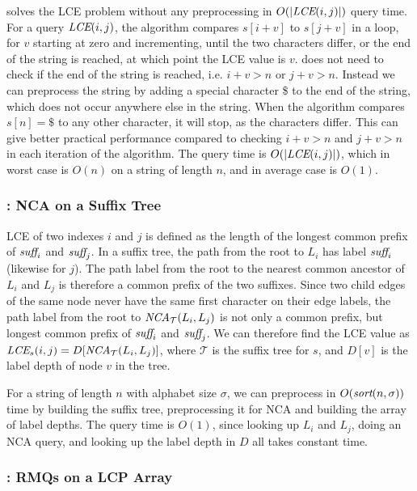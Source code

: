 \documentclass[a4]{article}
\begin{document}
 solves the LCE problem without any preprocessing in $O(|\textit{LCE}(i,j)|)$ query time. For a query $\textit{LCE}(i,j)$, the algorithm compares $s[i+v]$ to $s[j+v]$ in a loop, for $v$ starting at zero and incrementing, until the two characters differ, or the end of the string is reached, at which point the LCE value is $v$.  does not need to check if the end of the string is reached, i.e. $i+v>n$ or $j+v>n$. Instead we can preprocess the string by adding a special character \$ to the end of the string, which does not occur anywhere else in the string. When the algorithm compares $s[n] = \$$ to any other character, it will stop, as the characters differ. This can give better practical performance compared to checking $i+v>n$ and $j+v>n$ in each iteration of the algorithm. The query time is $O(|\textit{LCE}(i,j)|)$, which in worst case is $O(n)$ on a string of length $n$, and in average case is $O(1)$.

\subsubsection{: NCA on a Suffix Tree}

LCE of two indexes $i$ and $j$ is defined as the length of the longest common prefix of $\textit{suff}_i$ and $\textit{suff}_j$. In a suffix tree, the path from the root to $L_i$ has label $\textit{suff}_i$ (likewise for $j$). The path label from the root to the nearest common ancestor of $L_i$ and $L_j$ is therefore a common prefix of the two suffixes. Since two child edges of the same node never have the same first character on their edge labels, the path label from the root to $\textit{NCA}_\mathcal{T}(L_i,L_j)$ is not only a common prefix, but longest common prefix of $\textit{suff}_i$ and $\textit{suff}_j$. We can therefore find the LCE value as $\textit{LCE}_s(i,j) = D[\textit{NCA}_\mathcal{T}(L_i,L_j)]$, where $\mathcal{T}$ is the suffix tree for $s$, and $D[v]$ is the label depth of node $v$ in the tree.

For a string of length $n$ with alphabet size $\sigma$, we can preprocess  in $O(\textit{sort}(n,\sigma))$ time by building the suffix tree, preprocessing it for NCA and building the array of label depths. The query time is $O(1)$, since looking up $L_i$ and $L_j$, doing an NCA query, and looking up the label depth in $D$ all takes constant time.

\subsubsection{: RMQs on a LCP Array}
\end{document}

